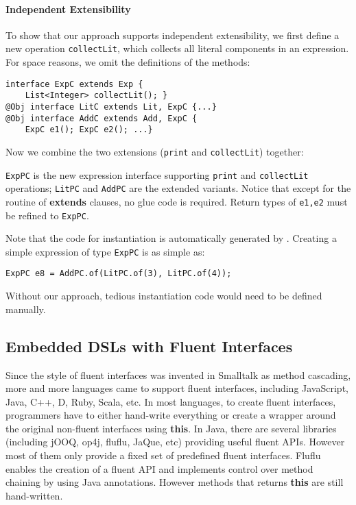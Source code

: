 \paragraph{Independent Extensibility}
To show that our approach supports independent extensibility, we first define a
new operation \texttt{collectLit}, which collects all
literal components in an expression. For space reasons,
we omit the definitions of the methods:

\begin{lstlisting}[]
interface ExpC extends Exp {
    List<Integer> collectLit(); }
@Obj interface LitC extends Lit, ExpC {...}
@Obj interface AddC extends Add, ExpC {
    ExpC e1(); ExpC e2(); ...}
\end{lstlisting}

\noindent Now we combine the two extensions (\texttt{print} and
\texttt{collectLit}) together:



\noindent \texttt{ExpPC} is the new expression interface supporting
\texttt{print} and \texttt{collectLit} operations; \texttt{LitPC} and
\texttt{AddPC} are the extended variants. Notice that except for the routine of
\textbf{extends} clauses, no glue code is required. Return types of
\texttt{e1,e2} must be refined to \texttt{ExpPC}.

Note that the code for instantiation is automatically generated by \mixin.
Creating a simple expression of type \texttt{ExpPC} is
as simple as:
\begin{lstlisting}
ExpPC e8 = AddPC.of(LitPC.of(3), LitPC.of(4));
\end{lstlisting}
\noindent Without our approach, tedious instantiation code would need
to be defined manually.

\subsection{Embedded DSLs with Fluent Interfaces}\label{sec:dsls}
Since the style of fluent interfaces was invented in Smalltalk as method
cascading, more and more languages came to support fluent interfaces, including
JavaScript, Java, C++, D, Ruby, Scala, etc. In most languages, to create fluent
interfaces, programmers have to either hand-write everything or create a wrapper
around the original non-fluent interfaces using \textbf{this}. In Java, there
are several libraries (including jOOQ, op4j, fluflu, JaQue, etc) providing useful
fluent APIs. However most of them only provide a fixed set of predefined fluent
interfaces. Fluflu enables the creation of a fluent API and implements control
over method chaining by using Java annotations. However methods that returns
\textbf{this} are still hand-written.

